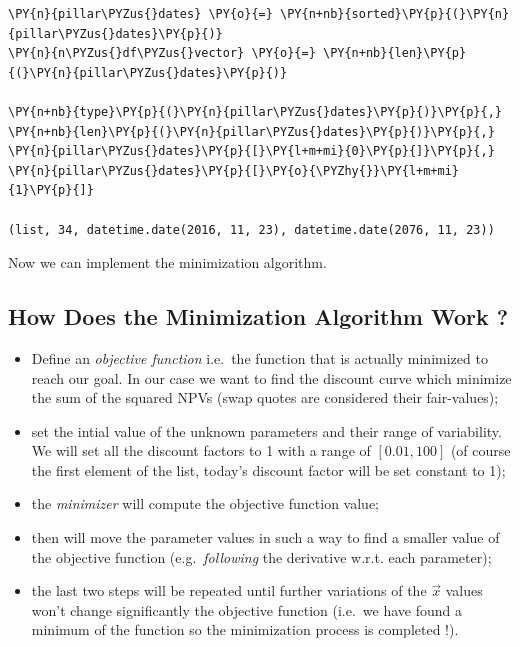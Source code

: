 \begin{tcolorbox}[breakable, size=fbox, boxrule=1pt, pad at break*=1mm,colback=cellbackground, colframe=cellborder]
\begin{Verbatim}[commandchars=\\\{\}]
\PY{n}{pillar\PYZus{}dates} \PY{o}{=} \PY{n+nb}{sorted}\PY{p}{(}\PY{n}{pillar\PYZus{}dates}\PY{p}{)}
\PY{n}{n\PYZus{}df\PYZus{}vector} \PY{o}{=} \PY{n+nb}{len}\PY{p}{(}\PY{n}{pillar\PYZus{}dates}\PY{p}{)}

\PY{n+nb}{type}\PY{p}{(}\PY{n}{pillar\PYZus{}dates}\PY{p}{)}\PY{p}{,} \PY{n+nb}{len}\PY{p}{(}\PY{n}{pillar\PYZus{}dates}\PY{p}{)}\PY{p}{,} \PY{n}{pillar\PYZus{}dates}\PY{p}{[}\PY{l+m+mi}{0}\PY{p}{]}\PY{p}{,} \PY{n}{pillar\PYZus{}dates}\PY{p}{[}\PY{o}{\PYZhy{}}\PY{l+m+mi}{1}\PY{p}{]}

(list, 34, datetime.date(2016, 11, 23), datetime.date(2076, 11, 23))
\end{Verbatim}
\end{tcolorbox}

Now we can implement the minimization algorithm.
            
\subsection{How Does the Minimization Algorithm Work ?}\label{how-does-the-minimization-algorithm-work}

\begin{itemize}
\item
  Define an \emph{objective function} i.e.~the function that is actually minimized to reach our goal. In our case we want to find the discount curve which minimize the sum of the squared NPVs (swap quotes are considered their fair-values);
\item
  set the intial value of the unknown parameters and their range of variability. We will set all the discount factors to 1 with a range of \([0.01, 100]\) (of course the first element of the list, today's discount factor will be set constant to 1);
\item
  the \emph{minimizer} will compute the objective function value;
\item
  then will move the parameter values in such a way to find a smaller value of the objective function (e.g.~\emph{following} the derivative w.r.t. each parameter);
\item
  the last two steps will be repeated until further variations of the $\vec{x}$ values won't change significantly the objective function (i.e.~we have found a minimum of the function so the minimization process is completed !).
\end{itemize}

